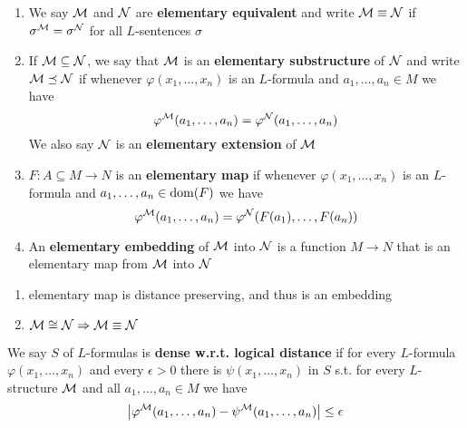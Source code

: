 \documentclass[11pt]{article}
\begin{document}
\begin{definition}[]
\begin{enumerate}
\item We say \(\mathcal{M}\) and \(\mathcal{N}\) are \textbf{elementary equivalent} and write \(\mathcal{M}\equiv\mathcal{N}\)
if \(\sigma^{\mathcal{M}}=\sigma^{\mathcal{N}}\) for all \(L\)-sentences \(\sigma\)
\item If \(\mathcal{M}\subseteq\mathcal{N}\), we say that \(\mathcal{M}\) is an \textbf{elementary substructure} of \(\mathcal{N}\)
and write \(\mathcal{M}\preceq\mathcal{N}\)
if whenever \(\varphi(x_1,\dots,x_n)\) is an \(L\)-formula and \(a_1,\dots,a_n\in M\) we have
 \begin{equation*}
\varphi^{\mathcal{M}}(a_1,\dots,a_n)=\varphi^{\mathcal{N}}(a_1,\dots,a_n)
 \end{equation*}
We also say \(\mathcal{N}\) is an \textbf{elementary extension} of \(\mathcal{M}\)
\item \(F:A\subseteq M\to N\) is an \textbf{elementary map} if whenever \(\varphi(x_1,\dots,x_n)\) is
an \(L\)-formula and \(a_1,\dots,a_n\in\operatorname{dom}(F)\) we have
 \begin{equation*}
\varphi^{\mathcal{M}}(a_1,\dots,a_n)=\varphi^{\mathcal{N}}(F(a_1),\dots,F(a_n))
 \end{equation*}
\item An \textbf{elementary embedding} of \(\mathcal{M}\) into \(\mathcal{N}\) is a function \(M\to N\) that is an
elementary map from \(\mathcal{M}\) into \(\mathcal{N}\)
\end{enumerate}
\end{definition}

\begin{remark}
\begin{enumerate}
\item elementary map is distance preserving, and thus is an embedding
\item \(\mathcal{M}\cong\mathcal{N}\Rightarrow\mathcal{M}\equiv\mathcal{N}\)
\end{enumerate}
\end{remark}

We say \(S\) of \(L\)-formulas is \textbf{dense w.r.t. logical distance} if for
every \(L\)-formula \(\varphi(x_1,\dots,x_n)\) and every \(\epsilon>0\) there is \(\psi(x_1,\dots,x_n)\) in \(S\)
s.t. for every \(L\)-structure \(\mathcal{M}\) and all \(a_1,\dots,a_n\in M\) we have
\begin{equation*}
  \abs{\varphi^{\calm}(a_1,\dots,a_n)-\psi^{\calm}(a_1,\dots,a_n)}\le\epsilon
\end{equation*}
\end{document}

